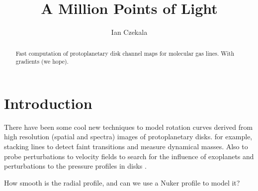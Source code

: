 \documentclass[modern]{aastex62}
\begin{document}
\title{A Million Points of Light}


\author[0000-0002-1483-8811]{Ian Czekala}


\begin{abstract}
Fast computation of protoplanetary disk channel maps for molecular gas lines. With gradients (we hope).
\end{abstract}


\section{Introduction} \label{sec:intro}

There have been some cool new techniques to model rotation curves derived from high resolution (spatial and spectra) images of protoplanetary disks. for example, \citet{yen16,yen18} stacking lines to detect faint transitions and measure dynamical masses. Also to probe perturbations to velocity fields to search for the influence of exoplanets \citet{teague18a} and perturbations to the pressure profiles in disks \citet{teague18c}.

How smooth is the radial profile, and can we use a Nuker profile to model it?

\end{document}
